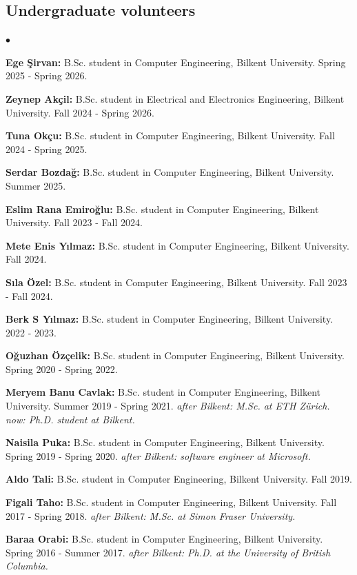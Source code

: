 \documentclass[margin,line]{res}
\newenvironment{list2}{
  \begin{list}{$\bullet$}{%
      \setlength{\itemsep}{0.1cm}
      \setlength{\parsep}{0in} \setlength{\parskip}{0in}
      \setlength{\topsep}{0in} \setlength{\partopsep}{0in} 
      \setlength{\leftmargin}{0.2in}}}{\end{list}}
\begin{document}
\begin{resume}
\subsection{\small \sc Undergraduate volunteers}
\begin{list2}
\item \textbf{Ege Şirvan:} B.Sc. student in Computer Engineering,  Bilkent University. Spring 2025 - Spring 2026.
\item  \textbf{Zeynep Akçil:} B.Sc. student in Electrical and Electronics Engineering,  Bilkent University. Fall 2024 - Spring 2026.
\item  \textbf{Tuna Okçu:} B.Sc. student in Computer Engineering,  Bilkent University.  Fall 2024 - Spring 2025.
\item \textbf{Serdar Bozdağ:} B.Sc. student in Computer Engineering,  Bilkent University. Summer 2025.
\item {\bf Eslim Rana Emiroğlu:} B.Sc. student in Computer Engineering,  Bilkent University. Fall 2023 - Fall 2024.
\item {\bf Mete Enis Yılmaz:} B.Sc. student in Computer Engineering,  Bilkent University. Fall 2024.
\item {\bf Sıla Özel:} B.Sc. student in Computer Engineering,  Bilkent University. Fall 2023 - Fall 2024.
\item {\bf Berk S Yılmaz:} B.Sc. student in Computer Engineering,  Bilkent University. 2022 - 2023.
\item {\bf Oğuzhan Özçelik:} B.Sc. student in Computer Engineering,  Bilkent University. Spring 2020 - Spring 2022.
\item {\bf Meryem Banu Cavlak:} B.Sc. student in Computer Engineering,  Bilkent University. Summer 2019 - Spring 2021. {\it after Bilkent: M.Sc. at ETH Zürich. now: Ph.D. student at Bilkent.}
\item {\bf Naisila Puka:} B.Sc. student in Computer Engineering,  Bilkent University. Spring 2019 - Spring 2020. {\it after Bilkent: software engineer at Microsoft.}
  \item {\bf Aldo Tali:} B.Sc. student in Computer Engineering,  Bilkent University. Fall 2019.
\item {\bf Figali Taho:} B.Sc. student in Computer Engineering,  Bilkent University. Fall 2017 - Spring 2018. {\it after Bilkent: M.Sc. at Simon Fraser University.}
\item {\bf Baraa Orabi:} B.Sc. student in Computer Engineering,  Bilkent University. Spring 2016 - Summer 2017. {\it after Bilkent: Ph.D. at the University of British Columbia.}


\end{list2}
\end{resume}
\end{document}

